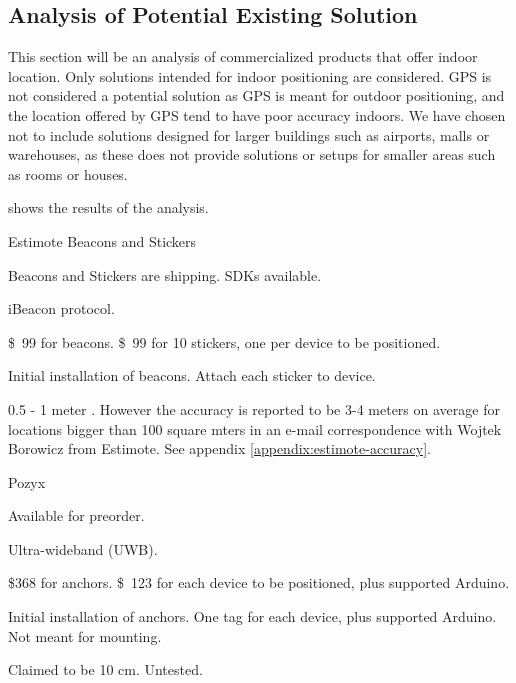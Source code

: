 \subsection{Analysis of Potential Existing Solution}
This section will be an analysis of commercialized products that offer indoor location.
Only solutions intended for indoor positioning are considered.
GPS is not considered a potential solution as GPS is meant for outdoor positioning, 
and the location offered by GPS tend to have poor accuracy indoors.
We have chosen not to include solutions designed for larger buildings such as airports, malls or warehouses, 
as these does not provide solutions or setups for smaller areas such as rooms or houses. 

 shows the results of the analysis. 
\begin{table}[!htb]
    \begin{description}[style=multiline,leftmargin=2.5cm]
        \item[Product:] Estimote Beacons and Stickers \cite{estimote}
        \item[Availability:] Beacons and Stickers are shipping. SDKs available.
        \item[Technology:] iBeacon protocol.
        \item[Price:] \SI{99}[\$]{} for beacons. \SI{99}[\$]{} for 10 stickers, one per device to be positioned.
        \item[Ease of use:] Initial installation of beacons. Attach each sticker to device.
        \item[Accuracy:] 0.5 - 1 meter \cite{estimote:accuracy}. However the accuracy is reported to be 3-4 meters on average for locations bigger than 100 square mters in an e-mail correspondence with Wojtek Borowicz from Estimote. See appendix \ref{appendix:estimote-accuracy}.

        \item[Product:] Pozyx \cite{pozyx}
        \item[Availability:] Available for preorder.
        \item[Technology:] Ultra-wideband (UWB).
        \item[Price:] \$368 for anchors. \SI{123}[\$]{} for each device to be positioned, plus supported Arduino.
        \item[Ease of use:] Initial installation of anchors. One tag for each device, plus supported Arduino. Not meant for mounting.
        \item[Accuracy:] Claimed to be 10 cm. Untested. \\
        

\end{description}
\end{table}

